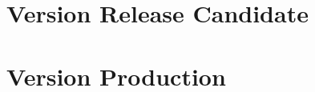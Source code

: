 \documentclass{tstextbook}
\begin{document}
\chapter{Version Release Candidate}


\chapter{Version Production}






% 

\end{document}
